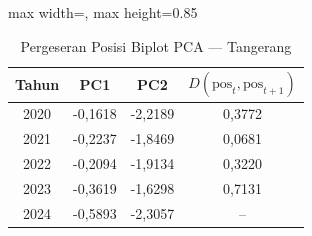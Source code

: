 \begin{table}[H]
\centering
\caption{Pergeseran Posisi Biplot PCA --- Tangerang} \label{tab:appjarak_pca_skor_tangerang}
\begin{adjustbox}{max width=\textwidth, max height=0.85\textheight}
\begin{tabular}{|c|c|c|c|}
\hline
\textbf{Tahun} & \textbf{PC1} & \textbf{PC2} & \textbf{$D(\text{pos}_t, \text{pos}_{t+1})$} \\
\hline
2020 & -0,1618 & -2,2189 & 0,3772 \\
2021 & -0,2237 & -1,8469 & 0,0681 \\
2022 & -0,2094 & -1,9134 & 0,3220 \\
2023 & -0,3619 & -1,6298 & 0,7131 \\
2024 & -0,5893 & -2,3057 & -- \\
\hline
\end{tabular}
\end{adjustbox}
\end{table}